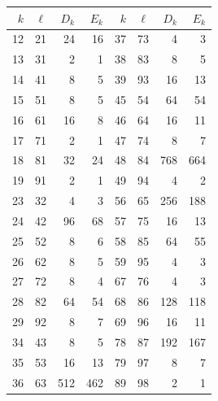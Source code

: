 \begin{tabular}{rrrr@{\qquad}rrrr}
\toprule
$k$&$\ell$&$D_k$&$E_k$&$k$&$\ell$&$D_k$&$E_k$\\
\midrule
12 & 21 & 24 & 16 & 37 & 73 & 4 & 3 \\
13 & 31 & 2 & 1 & 38 & 83 & 8 & 5 \\
14 & 41 & 8 & 5 & 39 & 93 & 16 & 13 \\
15 & 51 & 8 & 5 & 45 & 54 & 64 & 54 \\
16 & 61 & 16 & 8 & 46 & 64 & 16 & 11 \\
17 & 71 & 2 & 1 & 47 & 74 & 8 & 7 \\
18 & 81 & 32 & 24 & 48 & 84 & 768 & 664 \\
19 & 91 & 2 & 1 & 49 & 94 & 4 & 2 \\
23 & 32 & 4 & 3 & 56 & 65 & 256 & 188 \\
24 & 42 & 96 & 68 & 57 & 75 & 16 & 13 \\
25 & 52 & 8 & 6 & 58 & 85 & 64 & 55 \\
26 & 62 & 8 & 5 & 59 & 95 & 4 & 3 \\
27 & 72 & 8 & 4 & 67 & 76 & 4 & 3 \\
28 & 82 & 64 & 54 & 68 & 86 & 128 & 118 \\
29 & 92 & 8 & 7 & 69 & 96 & 16 & 11 \\
34 & 43 & 8 & 5 & 78 & 87 & 192 & 167 \\
35 & 53 & 16 & 13 & 79 & 97 & 8 & 7 \\
36 & 63 & 512 & 462 & 89 & 98 & 2 & 1 \\
\bottomrule
\end{tabular}
